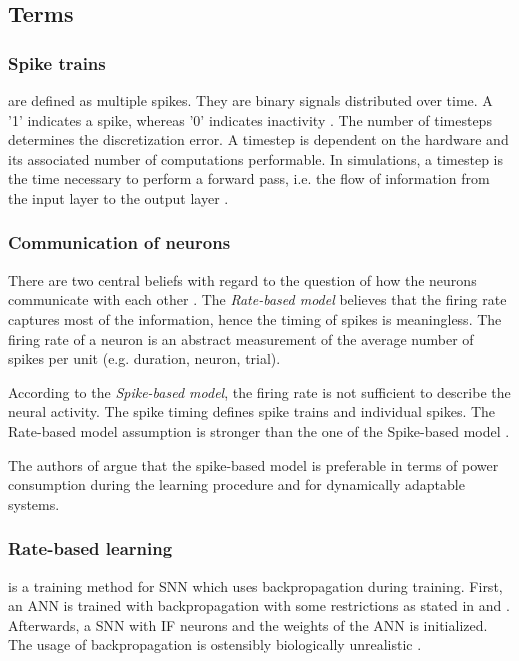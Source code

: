 \newcommand\rbModel{Rate-based model}
\newcommand\sbModel{Spike-based model}
\subsection{Terms}
\label{subsec:terms}

\subsubsection{Spike trains}
are defined as multiple spikes.
They are binary signals distributed over time.
A '1' indicates a spike, whereas '0' indicates inactivity \cite{DIET_SNN}.
The number of timesteps determines the discretization error.
A timestep is dependent on the hardware and its associated number of computations performable.
In simulations, a timestep is the time necessary to perform a forward pass, i.e. the flow of information from the input layer to the output layer \cite{DIET_SNN}.

\subsubsection{Communication of neurons}
\label{subsubsec:communication}
There are two central beliefs with regard to the question of how the neurons communicate with each other \cite{spike_vs_rate}.
The \textit{\rbModel{}} believes that the firing rate captures most of the information, hence the timing of spikes is meaningless.
The firing rate of a neuron is an abstract measurement of the average number of spikes per unit (e.g. duration, neuron, trial).

According to the \textit{\sbModel{}}, the firing rate is not sufficient to describe the neural activity.
The spike timing defines spike trains and individual spikes.
The \rbModel{} assumption is stronger than the one of the \sbModel{} \cite{spike_vs_rate}.

The authors of \cite{SNN} argue that the spike-based model is preferable in terms of power consumption 
during the learning procedure and for dynamically adaptable systems.


\subsubsection{Rate-based learning} is a training method for \ac{SNN} which uses backpropagation during training. 
First, an \ac{ANN} is trained with backpropagation with some restrictions as stated in \cite{DIET_SNN} and \cite{ANN_SNN_conversion}.
Afterwards, a \ac{SNN} with \ac{IF} neurons and the weights of the \ac{ANN} is initialized.
The usage of backpropagation is ostensibly biologically unrealistic \cite{SNN,STDP_like}.
